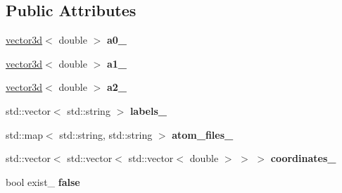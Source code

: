 \subsection*{Public Attributes}
\begin{DoxyCompactItemize}
\item 
\hypertarget{structsirius_1_1_unit__cell__input__section_a3ad3f2c01624befc33dc2af6782476df}{}\hyperlink{classgeometry3d_1_1vector3d}{vector3d}$<$ double $>$ {\bfseries a0\+\_\+}\label{structsirius_1_1_unit__cell__input__section_a3ad3f2c01624befc33dc2af6782476df}

\item 
\hypertarget{structsirius_1_1_unit__cell__input__section_af64fce8cb19c82b94bf55564001cfa8e}{}\hyperlink{classgeometry3d_1_1vector3d}{vector3d}$<$ double $>$ {\bfseries a1\+\_\+}\label{structsirius_1_1_unit__cell__input__section_af64fce8cb19c82b94bf55564001cfa8e}

\item 
\hypertarget{structsirius_1_1_unit__cell__input__section_aba2d9d67c6d15976fadd8b56c45c2f6b}{}\hyperlink{classgeometry3d_1_1vector3d}{vector3d}$<$ double $>$ {\bfseries a2\+\_\+}\label{structsirius_1_1_unit__cell__input__section_aba2d9d67c6d15976fadd8b56c45c2f6b}

\item 
\hypertarget{structsirius_1_1_unit__cell__input__section_af113b17436040bad03f7a9572a6e93ab}{}std\+::vector$<$ std\+::string $>$ {\bfseries labels\+\_\+}\label{structsirius_1_1_unit__cell__input__section_af113b17436040bad03f7a9572a6e93ab}

\item 
\hypertarget{structsirius_1_1_unit__cell__input__section_ac2f46276b225819106cf688e1e55784a}{}std\+::map$<$ std\+::string, std\+::string $>$ {\bfseries atom\+\_\+files\+\_\+}\label{structsirius_1_1_unit__cell__input__section_ac2f46276b225819106cf688e1e55784a}

\item 
\hypertarget{structsirius_1_1_unit__cell__input__section_a7b4d83fbf6001844382a17b8b16947b4}{}std\+::vector$<$ std\+::vector$<$ std\+::vector$<$ double $>$ $>$ $>$ {\bfseries coordinates\+\_\+}\label{structsirius_1_1_unit__cell__input__section_a7b4d83fbf6001844382a17b8b16947b4}

\item 
\hypertarget{structsirius_1_1_unit__cell__input__section_a2018488775ec322599bd2048b4772cdc}{}bool exist\+\_\+ {\bfseries false}\label{structsirius_1_1_unit__cell__input__section_a2018488775ec322599bd2048b4772cdc}

\end{DoxyCompactItemize}


